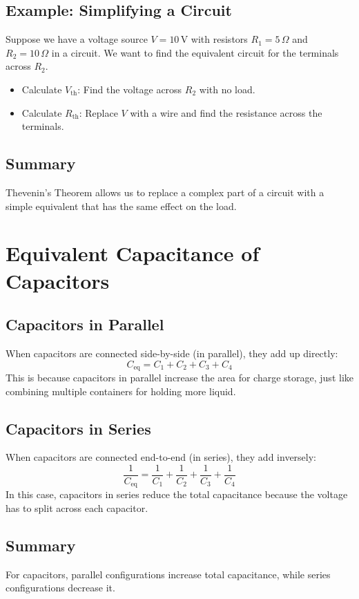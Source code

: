 \documentclass{article}
\begin{document}
\subsection{Example: Simplifying a Circuit}
Suppose we have a voltage source \( V = 10 \, \text{V} \) with resistors \( R_1 = 5 \, \Omega \) and \( R_2 = 10 \, \Omega \) in a circuit. We want to find the equivalent circuit for the terminals across \( R_2 \).
\begin{itemize}
    \item Calculate \( V_{\text{th}} \): Find the voltage across \( R_2 \) with no load.
    \item Calculate \( R_{\text{th}} \): Replace \( V \) with a wire and find the resistance across the terminals.
\end{itemize}

\subsection{Summary}
Thevenin's Theorem allows us to replace a complex part of a circuit with a simple equivalent that has the same effect on the load.

\newpage
\section{Equivalent Capacitance of Capacitors}

\subsection{Capacitors in Parallel}
When capacitors are connected side-by-side (in parallel), they add up directly:
\[
C_{\text{eq}} = C_1 + C_2 + C_3 + C_4
\]
This is because capacitors in parallel increase the area for charge storage, just like combining multiple containers for holding more liquid.

\subsection{Capacitors in Series}
When capacitors are connected end-to-end (in series), they add inversely:
\[
\frac{1}{C_{\text{eq}}} = \frac{1}{C_1} + \frac{1}{C_2} + \frac{1}{C_3} + \frac{1}{C_4}
\]
In this case, capacitors in series reduce the total capacitance because the voltage has to split across each capacitor.

\subsection{Summary}
For capacitors, parallel configurations increase total capacitance, while series configurations decrease it.
\end{document}
